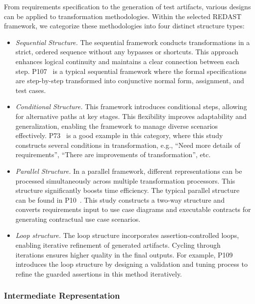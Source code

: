 

From requirements specification to the generation of test artifacts, various designs can be applied to transformation methodologies. Within the selected REDAST framework, we categorize these methodologies into four distinct structure types:
\begin{itemize}
    \item \emph{Sequential Structure.} The sequential framework conducts transformations in a strict, ordered sequence without any bypasses or shortcuts. This approach enhances logical continuity and maintains a clear connection between each step. P107~ is a typical sequential framework where the formal specifications are step-by-step transformed into conjunctive normal form, assignment, and test cases.
    \item \emph{Conditional Structure.} This framework introduces conditional steps, allowing for alternative paths at key stages. This flexibility improves adaptability and generalization, enabling the framework to manage diverse scenarios effectively. P73~ is a good example in this category, where this study constructs several conditions in transformation, e.g., ``Need more details of requirements'', ``There are improvements of transformation'', etc.
    \item \emph{Parallel Structure.} In a parallel framework, different representations can be processed simultaneously across multiple transformation processors. This structure significantly boosts time efficiency. The typical parallel structure can be found in P10~. This study constructs a two-way structure and converts requirements input to use case diagrams and executable contracts for generating contractual use case scenarios.
    \item \emph{Loop structure.} The loop structure incorporates assertion-controlled loops, enabling iterative refinement of generated artifacts. Cycling through iterations ensures higher quality in the final outputs. For example, P109~ introduces the loop structure by designing a validation and tuning process to refine the guarded assertions in this method iteratively.
\end{itemize}

\subsubsection{Intermediate Representation}

